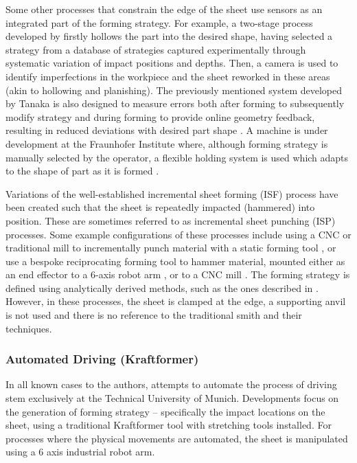 Some other processes that constrain the edge of the sheet use sensors as an integrated part of the forming strategy. For example, a two-stage process developed by \cite{Mori1998IncrementalDatabase} firstly hollows the part into the desired shape, having selected a strategy from a database of strategies captured experimentally through systematic variation of impact positions and depths. Then, a camera is used to identify imperfections in the workpiece and the sheet reworked in these areas (akin to hollowing and planishing). The previously mentioned system developed by Tanaka is also designed to measure errors both after forming to subsequently modify strategy and during forming to provide online geometry feedback, resulting  in reduced deviations with desired part shape \citep{Tanaka2008FormingMeasurement,Tanaka2014DevelopmentHammering}. A machine is under development at the Fraunhofer Institute where, although forming strategy is manually selected by the operator, a flexible holding system is used which adapts to the shape of part as it is formed \citep{Sharon2014FraunhoferReport}.

Variations of the well-established incremental sheet forming (ISF) process have been created such that the sheet is repeatedly impacted (hammered) into position. These are sometimes referred to as incremental sheet punching (ISP) processes. Some example configurations of these processes include using a CNC or traditional mill to incrementally punch material with a static forming tool \citep{Wang2017IncrementalPath,Zhu2019ToolForming}, or use a bespoke reciprocating forming tool to hammer material, mounted either as an end effector to a 6-axis robot arm \citep{Schafer2005IncrementalRobots, Puzik2008IncrementalApplication, Luo2010AResults}, or to a CNC mill \citep{Asgari2017DesignDamper}. The forming strategy is defined using analytically derived methods, such as the ones described in \cite{Schafer2005IncrementalRobots,Wang2017IncrementalPath,Zhu2019ToolForming,Luo2010ASimulation}. However, in these processes, the sheet is clamped at the edge, a supporting anvil is not used and there is no reference to the traditional smith and their techniques.
 

\subsubsection{Automated Driving (Kraftformer)} \label{sec:MechKraftformer}
In all known cases to the authors, attempts to automate the process of driving stem exclusively at the Technical University of Munich. Developments focus on the generation of forming strategy – specifically the impact locations on the sheet, using a traditional Kraftformer tool with stretching tools installed. For processes where the physical movements are automated, the sheet is manipulated using a 6 axis industrial robot arm.

